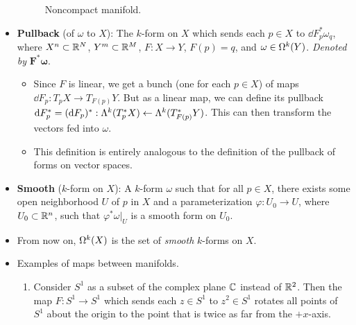 \documentclass[../notes.tex]{subfiles}
\begin{document}
\begin{itemize}
\begin{figure}[H]
        \caption{Noncompact manifold.}
        \label{fig:noncompactManifold}
    \end{figure}
    \item \textbf{Pullback} (of $\omega$ to $X$): The $k$-form on $X$ which sends each $p\in X$ to $\dd{F}_p^*\omega_q$, where $X^n\subset\R^N$, $Y^m\subset\R^M$, $F:X\to Y$, $F(p)=q$, and $\omega\in\ome[k]{Y}$. \emph{Denoted by} $\bm{F^*\omega}$.
    \begin{itemize}
        \item Since $F$ is linear, we get a bunch (one for each $p\in X$) of maps $\dd F_p:T_pX\to T_{F(p)}Y$. But as a linear map, we can define its pullback $\dd F_p^*=(\dd F_p)^*:\lam[k]{T_p^*X}\leftarrow\lam[k]{T_{F(p)}^*Y}$. This can then transform the vectors fed into $\omega$.
        \item This definition is entirely analogous to the definition of the pullback of forms on vector spaces.
    \end{itemize}
    \item \textbf{Smooth} ($k$-form on $X$): A $k$-form $\omega$ such that for all $p\in X$, there exists some open neighborhood $U$ of $p$ in $X$ and a parameterization $\varphi:U_0\to U$, where $U_0\subset\R^n$, such that $\varphi^*\omega|_U$ is a smooth form on $U_0$.
    \item From now on, $\ome[k]{X}$ is the set of \emph{smooth} $k$-forms on $X$.
    \item Examples of maps between manifolds.
    \begin{enumerate}
        \item Consider $S^1$ as a subset of the complex plane $\C$ instead of $\R^2$. Then the map $F:S^1\to S^1$ which sends each $z\in S^1$ to $z^2\in S^1$ rotates all points of $S^1$ about the origin to the point that is twice as far from the $+x$-axis.

\end{enumerate}
\end{itemize}
\end{document}
